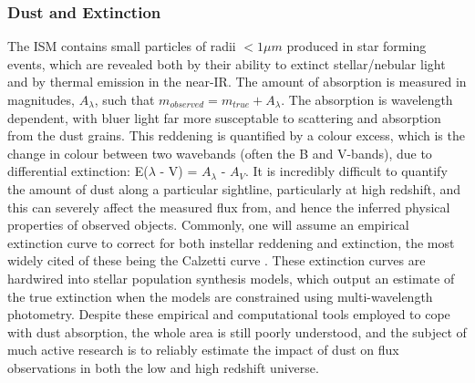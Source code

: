 \documentclass{literature}
\begin{document}
\subsubsection{Dust and Extinction}\label{subsec:dust}
The ISM contains small particles of radii $< 1\mu m$ produced in star forming events, which are revealed both by their ability to extinct stellar/nebular light and by thermal emission in the near-IR. The amount of absorption is measured in magnitudes, $A_{\lambda}$, such that $m_{observed} = m_{true} + A_{\lambda}$. The absorption is wavelength dependent, with bluer light far more susceptable to scattering and absorption from the dust grains. This reddening is quantified by a colour excess, which is the change in colour between two wavebands (often the B and V-bands), due to differential extinction: E($\lambda$ - V) = $A_{\lambda}$ - $A_{V}$. It is incredibly difficult to quantify the amount of dust along a particular sightline, particularly at high redshift, and this can severely affect the measured flux from, and hence the inferred physical properties of observed objects. Commonly, one will assume an empirical extinction curve to correct for both instellar reddening and extinction, the most widely cited of these being the Calzetti curve \citep{Calzetti2000}. These extinction curves are hardwired into stellar population synthesis models, which output an estimate of the true extinction when the models are constrained using multi-wavelength photometry. Despite these empirical and computational tools employed to cope with dust absorption, the whole area is still poorly understood, and the subject of much active research is to reliably estimate the impact of dust on flux observations in both the low and high redshift universe.        	
\end{document}
